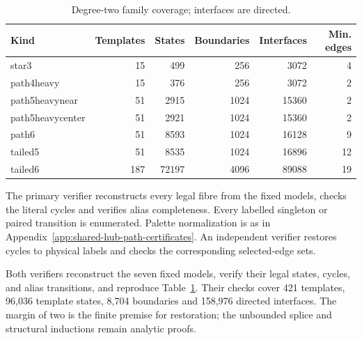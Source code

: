 \begin{table}[htbp]
\centering\small
\caption{Degree-two family coverage; interfaces are directed.}
\label{tab:degree-two-family-counts}
\begin{tabular}{lrrrrr}
\toprule
Kind & Templates & States & Boundaries & Interfaces & Min. edges\\
\midrule
star3&15&499&256&3072&4\\
path4heavy&15&376&256&3072&2\\
path5heavynear&51&2915&1024&15360&2\\
path5heavycenter&51&2921&1024&15360&2\\
path6&51&8593&1024&16128&9\\
tailed5&51&8535&1024&16896&12\\
tailed6&187&72197&4096&89088&19\\
\bottomrule
\end{tabular}
\end{table}

The primary verifier reconstructs every legal fibre from the fixed models,
checks the literal cycles and verifies alias completeness. Every labelled
singleton or paired transition is enumerated. Palette normalization is as in
Appendix~\ref{app:shared-hub-path-certificates}. An independent verifier
restores cycles to physical labels and checks the corresponding selected-edge
sets.

Both verifiers reconstruct the seven fixed models, verify their legal states,
cycles, and alias transitions, and reproduce
Table~\ref{tab:degree-two-family-counts}. Their checks cover 421 templates,
96,036 template states, 8,704 boundaries and 158,976 directed interfaces.
The margin of two is the finite premise for restoration; the unbounded splice
and structural inductions remain analytic proofs.

\clearpage
